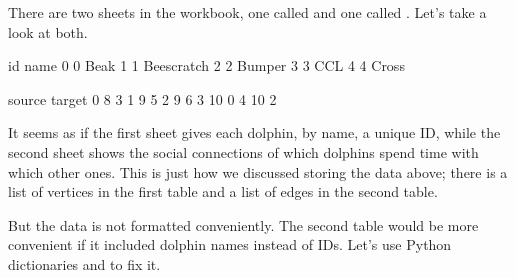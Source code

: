 \documentclass[letterpaper,10pt,english]{jupyterBook}
\begin{document}
\sphinxAtStartPar
There are two sheets in the workbook, one called  and one called .  Let’s take a look at both.

\begin{sphinxVerbatim}[commandchars=\\\{\}]
  \PYG{p}{[}\PYG{p}{]}
\end{sphinxVerbatim}

\begin{sphinxVerbatim}[commandchars=\\\{\}]
   id        name
0   0        Beak
1   1  Beescratch
2   2      Bumper
3   3         CCL
4   4       Cross
\end{sphinxVerbatim}

\begin{sphinxVerbatim}[commandchars=\\\{\}]
  \PYG{p}{[}\PYG{p}{]}
\end{sphinxVerbatim}

\begin{sphinxVerbatim}[commandchars=\\\{\}]
   source  target
0       8       3
1       9       5
2       9       6
3      10       0
4      10       2
\end{sphinxVerbatim}

\sphinxAtStartPar
It seems as if the first sheet gives each dolphin, by name, a unique ID, while the second sheet shows the social connections of which dolphins spend time with which other ones.  This is just how we discussed storing the data above; there is a list of vertices in the first table and a list of edges in the second table.

\sphinxAtStartPar
But the data is not formatted conveniently.  The second table would be more convenient if it included dolphin names instead of IDs.  Let’s use Python dictionaries and  to fix it.

\begin{sphinxVerbatim}[commandchars=\\\{\}]
       
   
\end{sphinxVerbatim}
\end{document}
